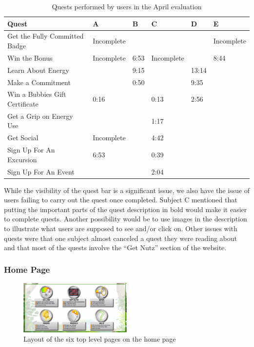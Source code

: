 \begin{table}[t]
	\begin{tabular}{| l || l | l | l | l | l |}
		\hline
		Quest & A & B & C & D & E \\
		\hline
		Get the Fully Committed Badge & Incomplete & & & & Incomplete \\
		Win the \textdollar10 Bonus & Incomplete & 6:53 & Incomplete & & 8:44 \\
		Learn About Energy & & 9:15 & & 13:14 &\\
		Make a Commitment & & 0:50 & & 9:35 & \\
		Win a Bubbies Gift Certificate & 0:16 & & 0:13 & 2:56 & \\
		Get a Grip on Energy Use & & & 1:17 & & \\
		Get Social & Incomplete & & 4:42 & & \\
		Sign Up For An Excursion & 6:53 & & 0:39 & & \\
		Sign Up For An Event & & & 2:04 & & \\
		\hline
	\end{tabular}
	\caption{Quests performed by users in the April evaluation}
	\label{table:april-quest}
\end{table}

While the visibility of the quest bar is a significant issue, we also have the issue of users failing to carry out the quest once completed. Subject C mentioned that putting the important parts of the quest description in bold would make it easier to complete quests. Another possibility would be to use images in the description to illustrate what users are supposed to see and/or click on. Other issues with quests were that one subject almost canceled a quest they were reading about and that most of the quests involve the ``Get Nutz'' section of the website.

\subsubsection{Home Page}

\begin{figure}[t]
    \center
    \includegraphics[width=0.5\textwidth]{images/home-april.eps}
    \caption{Layout of the six top level pages on the home page}
    \label{fig:home-page-april}
\end{figure}

